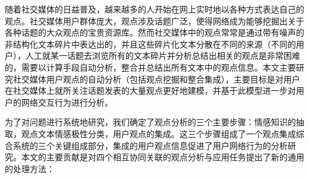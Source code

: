 \begin{cabstract}
随着社交媒体的日益普及，越来越多的人开始在网上实时地以各种方式表达自己的观点。社交媒体用户群体庞大，观点涉及话题广泛，使得网络成为能够挖掘出关于各种话题的大众观点的宝贵资源库。然而社交媒体中的观点常常是通过带有噪声的非结构化文本碎片中表达出的，并且这些碎片化文本分散在不同的来源（不同的用户），人工就某一话题去浏览所有的文本碎片并分析总结出相关的观点是非常困难的，需要以计算手段自动分析，整合并总结出所有文本中的观点信息。本文主要研究社交媒体用户观点的自动分析（包括观点挖掘和整合集成），主要目标是对用户在社交媒体上就所关注话题发表的大量观点更好地建模，并基于此模型进一步对用户的网络交互行为进行分析。

为了对问题进行系统地研究，我们确定了观点分析的三个主要步骤：情感知识的抽取，观点文本情感极性分类，用户观点的集成。这三个步骤组成了一个观点集成综合系统的三个关键组成部分，集成的用户观点信息促进了用户网络行为的分析研究。本文的主要贡献是对四个相互协同关联的观点分析与应用任务提出了新的通用的处理方法：


\end{cabstract}
